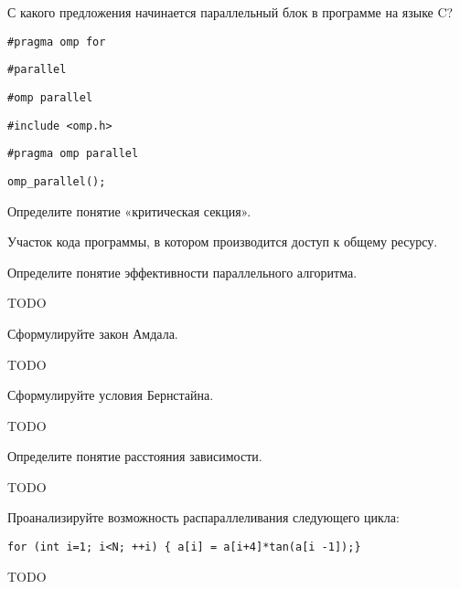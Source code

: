 \documentclass[a4paper, 12pt, addpoints]{exam}
\newcommand{\todo}{{\color{red}TODO}\ }
\begin{document}
\begin{questions}
\question[1] С какого предложения начинается параллельный блок в программе на языке C?
\begin{choices}
    \choice \begin{verbatim}#pragma omp for\end{verbatim}
    \choice \begin{verbatim}#parallel\end{verbatim}
    \choice \begin{verbatim}#omp parallel\end{verbatim}
    \choice \begin{verbatim}#include <omp.h>\end{verbatim}
    \correctchoice \begin{verbatim}#pragma omp parallel\end{verbatim}
    \choice \begin{verbatim}omp_parallel();\end{verbatim}
\end{choices}



\question[3] Определите понятие «критическая секция».
\begin{solution}[2cm]
Участок кода программы, в котором производится доступ к общему ресурсу.
\end{solution}

\question[3] Определите понятие эффективности параллельного алгоритма.
\begin{solution}[2cm]
\todo
\end{solution}

\question[3] Сформулируйте закон Амдала.
\begin{solution}[2cm]
\todo
\end{solution}

\question[3] Сформулируйте условия Бернстайна.
\begin{solution}[2cm]
\todo
\end{solution}

\question[3] Определите понятие расстояния зависимости.
\begin{solution}[2cm]
\todo
\end{solution}

\question[3] Проанализируйте возможность распараллеливания следующего цикла:
\begin{lstlisting}
for (int i=1; i<N; ++i) { a[i] = a[i+4]*tan(a[i -1]);}
\end{lstlisting}
\begin{solution}[2cm]
\todo
\end{solution}


\end{questions}
\end{document}
